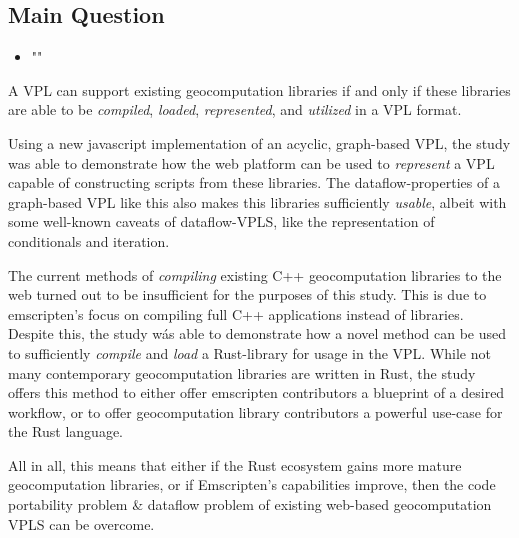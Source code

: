 \subsection*{Main Question}

\begin{itemize}[ ]
    \item "\myMainRQ"
\end{itemize}


A VPL can support existing geocomputation libraries if and only if these libraries are able to be \emph{compiled}, \emph{loaded}, \emph{represented}, and \emph{utilized} in a VPL format.

Using a new javascript implementation of an acyclic, graph-based VPL, the study was able to demonstrate how the web platform can be used to \emph{represent} a VPL capable of constructing scripts from these libraries.
The dataflow-properties of a graph-based VPL like this also makes this libraries sufficiently \emph{usable}, albeit with some well-known caveats of dataflow-VPLS, like the representation of conditionals and iteration. 

The current methods of \emph{compiling} existing C++ geocomputation libraries to the web turned out to be insufficient for the purposes of this study.  
This is due to emscripten's focus on compiling full C++ applications instead of libraries.
Despite this, the study wás able to demonstrate how a novel method can be used to sufficiently \emph{compile} and \emph{load} a Rust-library for usage in the VPL.
While not many contemporary geocomputation libraries are written in Rust, the study offers this method to either offer emscripten contributors a blueprint of a desired workflow, or to offer geocomputation library contributors a powerful use-case for the Rust language. 

All in all, this means that either if the Rust ecosystem gains more mature geocomputation libraries, or if Emscripten's capabilities improve, then the code portability problem \& dataflow problem of existing web-based geocomputation VPLS can be overcome. 


